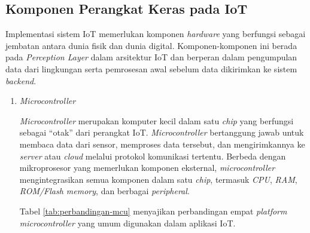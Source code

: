 \subsection{Komponen Perangkat Keras pada IoT}

Implementasi sistem IoT memerlukan komponen \textit{hardware} yang berfungsi sebagai jembatan antara dunia fisik dan dunia digital. Komponen-komponen ini berada pada \textit{Perception Layer} dalam arsitektur IoT dan berperan dalam pengumpulan data dari lingkungan serta pemrosesan awal sebelum data dikirimkan ke sistem \textit{backend}.

\begin{enumerate}
  \item \textit{Microcontroller}

  \textit{Microcontroller} merupakan komputer kecil dalam satu \textit{chip} yang berfungsi sebagai ``otak'' dari perangkat IoT. \textit{Microcontroller} bertanggung jawab untuk membaca data dari sensor, memproses data tersebut, dan mengirimkannya ke \textit{server} atau \textit{cloud} melalui protokol komunikasi tertentu. Berbeda dengan mikroprosesor yang memerlukan komponen eksternal, \textit{microcontroller} mengintegrasikan semua komponen dalam satu \textit{chip}, termasuk \textit{CPU}, \textit{RAM}, \textit{ROM/Flash memory}, dan berbagai \textit{peripheral}.

  Tabel \ref{tab:perbandingan-mcu} menyajikan perbandingan empat \textit{platform microcontroller} yang umum digunakan dalam aplikasi IoT.


\end{enumerate}
